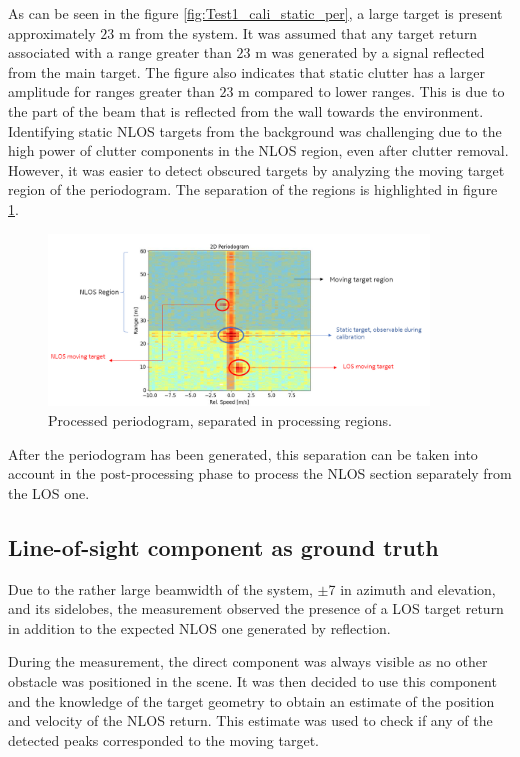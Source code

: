 As can be seen in the figure \ref{fig:Test1_cali_static_per}, a large target is present approximately $23$ m from the system. It was assumed that any target return associated with a range greater than $23$ m was generated by a signal reflected from the main target. The figure also indicates that static clutter has a larger amplitude for ranges greater than $23$ m compared to lower ranges. This is due to the part of the beam that is reflected from the wall towards the environment.
Identifying static NLOS targets from the background was challenging due to the high power of clutter components in the NLOS region, even after clutter removal. However, it was easier to detect obscured targets by analyzing the moving target region of the periodogram. The separation of the regions is highlighted in figure \ref{fig:Test1_nlos_los_separation}.

\begin{figure}[H]
	\centering
	\includegraphics[width=0.9\textwidth]{Images/Test1/nlos-los-separation.png}
	\caption{Processed periodogram, separated in processing regions.}
	\label{fig:Test1_nlos_los_separation}
\end{figure}


After the periodogram has been generated, this separation can be taken into account in the post-processing phase to process the NLOS section separately from the LOS one.

\subsection{Line-of-sight component as ground truth}

Due to the rather large beamwidth of the system, $\pm$7\textdegree\hspace{1pt} in azimuth and elevation, and its sidelobes, the measurement observed the presence of a LOS target return in addition to the expected NLOS one generated by reflection.

During the measurement, the direct component was always visible as no other obstacle was positioned in the scene. It was then decided to use this component and the knowledge of the target geometry to obtain an estimate of the position and velocity of the NLOS return. This estimate was used to check if any of the detected peaks corresponded to the moving target.

